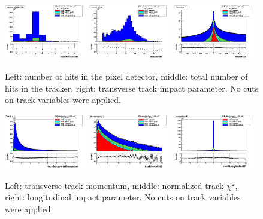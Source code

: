 \begin{figure}[h!]
\centering
\includegraphics[width=0.32\textwidth]{figures/trackNPixelHits_Linear.png}
\includegraphics[width=0.32\textwidth]{figures/trackNHits_Linear.png}
\includegraphics[width=0.32\textwidth]{figures/trackIP2d_Log.png}
\caption{Left: number of hits in the pixel detector, middle: total number of hits in the tracker, right: transverse track impact parameter. No cuts on  track variables were applied.}
\label{fig:inputVars1}
\end{figure}

\begin{figure}[h!]
\centering
\includegraphics[width=0.32\textwidth]{figures/trackTransverseMomentum_Linear.png}
\includegraphics[width=0.32\textwidth]{figures/trackNormChi2_Log.png}
\includegraphics[width=0.32\textwidth]{figures/trackLongitudinalIP_Linear.png}
\caption{Left: transverse track momentum, middle: normalized track $\chi^2$, right: longitudinal impact parameter.  No cuts on track variables were applied.}
\label{fig:inputVars2}
\end{figure}

